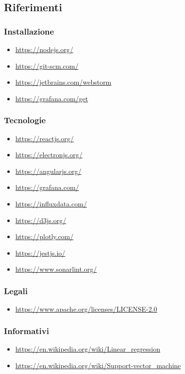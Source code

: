 \subsection{Riferimenti}
\subsubsection{Installazione}
\begin{itemize}
	\item \url{https://nodejs.org/}
	\item \url{https://git-scm.com/}
	\item \url{https://jetbrains.com/webstorm}
	\item \url{https://grafana.com/get}
\end{itemize}
\subsubsection{Tecnologie}
\begin{itemize}
	\item \url{https://reactjs.org/}
	\item \url{https://electronjs.org/}
	\item \url{https://angularjs.org/}
	\item \url{https://grafana.com/}
	\item \url{https://influxdata.com/}
	\item \url{https://d3js.org/}
	\item \url{https://plotly.com/}
	\item \url{https://jestjs.io/}
	\item \url{https://www.sonarlint.org/}
\end{itemize}
\subsubsection{Legali}
\begin{itemize}
	\item \url{https://www.apache.org/licenses/LICENSE-2.0}
\end{itemize}
\subsubsection{Informativi}
\begin{itemize}
	\item \url{https://en.wikipedia.org/wiki/Linear_regression}
	\item \url{https://en.wikipedia.org/wiki/Support-vector_machine}
\end{itemize}
